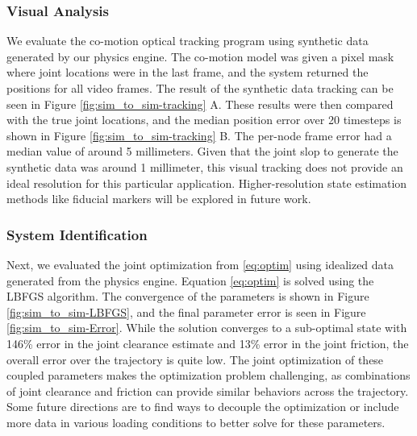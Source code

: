 \subsubsection{Visual Analysis}
We evaluate the co-motion optical tracking program using synthetic data generated by our physics engine. The co-motion model was given a pixel mask where joint locations were in the last frame, and the system returned the positions for all video frames. The result of the synthetic data tracking can be seen in Figure \ref{fig:sim_to_sim-tracking} A. These results were then compared with the true joint locations, and the median position error over 20 timesteps is shown in Figure \ref{fig:sim_to_sim-tracking} B. The per-node frame error had a median value of around 5 millimeters. Given that the joint slop to generate the synthetic data was around 1 millimeter, this visual tracking does not provide an ideal resolution for this particular application. Higher-resolution state estimation methods like fiducial markers will be explored in future work. 

\subsubsection{System Identification}
Next, we evaluated the joint optimization from \eqref{eq:optim} using idealized data generated from the physics engine. Equation \eqref{eq:optim} is solved using the LBFGS algorithm. The convergence of the parameters is shown in Figure \ref{fig:sim_to_sim-LBFGS}, and the final parameter error is seen in Figure \ref{fig:sim_to_sim-Error}. While the solution converges to a sub-optimal state with 146\% error in the joint clearance estimate and 13\% error in the joint friction, the overall error over the trajectory is quite low. The joint optimization of these coupled parameters makes the optimization problem challenging, as combinations of joint clearance and friction can provide similar behaviors across the trajectory. Some future directions are to find ways to decouple the optimization or include more data in various loading conditions to better solve for these parameters. 


